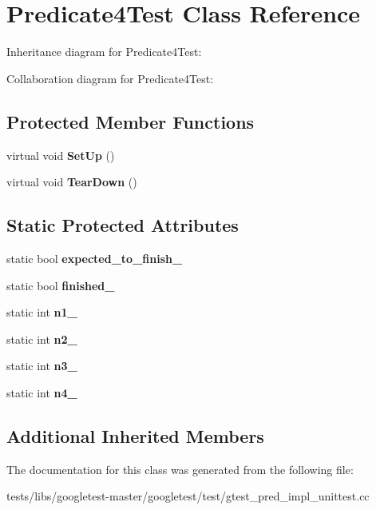 \hypertarget{classPredicate4Test}{}\section{Predicate4\+Test Class Reference}
\label{classPredicate4Test}


Inheritance diagram for Predicate4\+Test\+:


Collaboration diagram for Predicate4\+Test\+:
\subsection*{Protected Member Functions}
\begin{DoxyCompactItemize}
\item 
\mbox{\label{classPredicate4Test_afcf9db5dc68e97291813cdfeb2aaa5d2}} 
virtual void {\bfseries Set\+Up} ()
\item 
\mbox{\label{classPredicate4Test_ab61983a4cdf3657b02bc2b81b67729c4}} 
virtual void {\bfseries Tear\+Down} ()
\end{DoxyCompactItemize}
\subsection*{Static Protected Attributes}
\begin{DoxyCompactItemize}
\item 
\mbox{\label{classPredicate4Test_a20600b5eda187c42ce4e812e77269654}} 
static bool {\bfseries expected\+\_\+to\+\_\+finish\+\_\+}
\item 
\mbox{\label{classPredicate4Test_acfd174bf9dfb5a91afbcdca17e797888}} 
static bool {\bfseries finished\+\_\+}
\item 
\mbox{\label{classPredicate4Test_a8eb30cd283e613f7a2e501a3969be9ae}} 
static int {\bfseries n1\+\_\+}
\item 
\mbox{\label{classPredicate4Test_a088fce743c747e3851c926cb3a87fda3}} 
static int {\bfseries n2\+\_\+}
\item 
\mbox{\label{classPredicate4Test_a00ae6ae54c7d6639d448c036aedb6114}} 
static int {\bfseries n3\+\_\+}
\item 
\mbox{\label{classPredicate4Test_ae42e23ce11e3f1c6b813496d6180cc67}} 
static int {\bfseries n4\+\_\+}
\end{DoxyCompactItemize}
\subsection*{Additional Inherited Members}


The documentation for this class was generated from the following file\+:\begin{DoxyCompactItemize}
\item 
tests/libs/googletest-\/master/googletest/test/gtest\+\_\+pred\+\_\+impl\+\_\+unittest.\+cc\end{DoxyCompactItemize}
